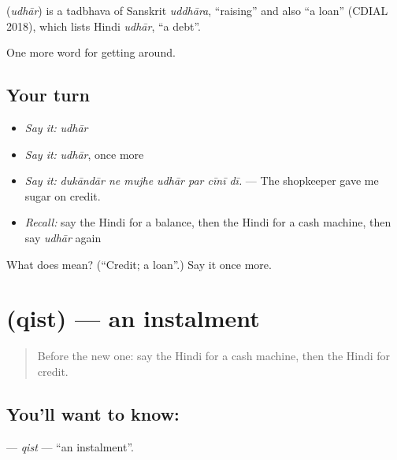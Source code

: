 \begin{cousinweb}
\textbf{} (\emph{udhār}) is a tadbhava of Sanskrit \emph{uddhāra}, \textquotedblleft{}raising\textquotedblright{} and also \textquotedblleft{}a loan\textquotedblright{} (CDIAL 2018), which lists Hindi \emph{udhār}, \textquotedblleft{}a debt\textquotedblright{}.
\end{cousinweb}

\begin{grammarlens}[title={What you've built}]
One more word for getting around.
\end{grammarlens}

\subsection*{Your turn}
\begin{itemize}
\raggedright
  \item \emph{Say it:} \emph{udhār}
  \item \emph{Say it:} \emph{udhār}, once more
  \item \emph{Say it:} \emph{dukāndār ne mujhe udhār par cīnī dī.} — The shopkeeper gave me sugar on credit.
  \item \emph{Recall:} say the Hindi for a balance, then the Hindi for a cash machine, then say \emph{udhār} again
\end{itemize}

\begin{tcolorbox}[breakable,colback=teal!4,colframe=teal!35!black,title={Before you move on}]
What does  mean? (\textquotedblleft{}Credit; a loan\textquotedblright{}.) Say it once more.
\end{tcolorbox}
\section[\texorpdfstring{\hi{क़िस्त} (qist)}{क़िस्त (qist)}]{ (qist) — an instalment}

\label{lesson:HI-C427-qist}



\begin{quote}
Before the new one: say the Hindi for a cash machine, then the Hindi for credit.
\end{quote}

\subsection*{You'll want to know: }
\textbf{} — \emph{qist} — \textquotedblleft{}an instalment\textquotedblright{}.

